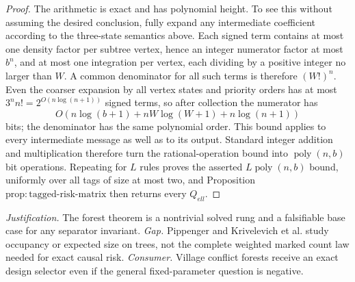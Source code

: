 \documentclass{article}
\begin{document}
\begin{proof}
The arithmetic is exact and has polynomial height.  To see this without assuming the desired conclusion, fully expand any intermediate coefficient according to the three-state semantics above.  Each signed term contains at most one density factor per subtree vertex, hence an integer numerator factor at most \(b^n\), and at most one integration per vertex, each dividing by a positive integer no larger than \(W\).  A common denominator for all such terms is therefore \((W!)^n\).  Even the coarser expansion by all vertex states and priority orders has at most \(3^n n!=2^{O(n\log(n+1))}\) signed terms, so after collection the numerator has
\[
 O\!\left(n\log(b+1)+nW\log(W+1)+n\log(n+1)\right)
\]
bits; the denominator has the same polynomial order.  This bound applies to every intermediate message as well as to its output.  Standard integer addition and multiplication therefore turn the rational-operation bound into \(\operatorname{poly}(n,b)\) bit operations.  Repeating for \(L\) rules proves the asserted \(L\operatorname{poly}(n,b)\) bound, uniformly over all tags of size at most two, and Proposition \(\mathrm{prop:tagged\mbox{-}risk\mbox{-}matrix}\) then returns every \(Q_{ell}\).
\end{proof}
\par\smallskip\noindent \textit{Justification.} The forest theorem is a nontrivial solved rung and a falsifiable base case for any separator invariant. \textit{Gap.} Pippenger and Krivelevich et al. study occupancy or expected size on trees, not the complete weighted marked count law needed for exact causal risk. \textit{Consumer.} Village conflict forests receive an exact design selector even if the general fixed-parameter question is negative.
\end{document}
